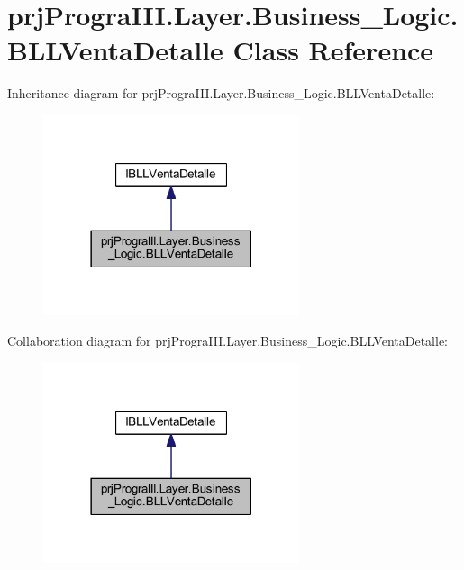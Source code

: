 \hypertarget{classprj_progra_i_i_i_1_1_layer_1_1_business___logic_1_1_b_l_l_venta_detalle}{}\section{prj\+Progra\+I\+I\+I.\+Layer.\+Business\+\_\+\+Logic.\+B\+L\+L\+Venta\+Detalle Class Reference}
\label{classprj_progra_i_i_i_1_1_layer_1_1_business___logic_1_1_b_l_l_venta_detalle}


Inheritance diagram for prj\+Progra\+I\+I\+I.\+Layer.\+Business\+\_\+\+Logic.\+B\+L\+L\+Venta\+Detalle\+:
\nopagebreak
\begin{figure}[H]
\begin{center}
\leavevmode
\includegraphics[width=213pt]{classprj_progra_i_i_i_1_1_layer_1_1_business___logic_1_1_b_l_l_venta_detalle__inherit__graph}
\end{center}
\end{figure}


Collaboration diagram for prj\+Progra\+I\+I\+I.\+Layer.\+Business\+\_\+\+Logic.\+B\+L\+L\+Venta\+Detalle\+:
\nopagebreak
\begin{figure}[H]
\begin{center}
\leavevmode
\includegraphics[width=213pt]{classprj_progra_i_i_i_1_1_layer_1_1_business___logic_1_1_b_l_l_venta_detalle__coll__graph}
\end{center}
\end{figure}
